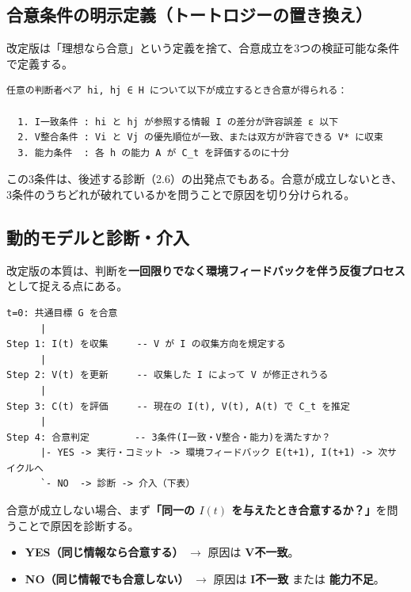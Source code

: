 \documentclass[11pt]{ltjsarticle}
\begin{document}
\subsection{合意条件の明示定義（トートロジーの置き換え）}

改定版は「理想なら合意」という定義を捨て、合意成立を3つの検証可能な条件で定義する。

\begin{Verbatim}[frame=single,fontsize=\small]
任意の判断者ペア hi, hj ∈ H について以下が成立するとき合意が得られる：

  1. I一致条件 : hi と hj が参照する情報 I の差分が許容誤差 ε 以下
  2. V整合条件 : Vi と Vj の優先順位が一致、または双方が許容できる V* に収束
  3. 能力条件  : 各 h の能力 A が C_t を評価するのに十分
\end{Verbatim}

この3条件は、後述する診断（2.6）の出発点でもある。合意が成立しないとき、3条件のうちどれが破れているかを問うことで原因を切り分けられる。

\subsection{動的モデルと診断・介入}

改定版の本質は、判断を\textbf{一回限りでなく環境フィードバックを伴う反復プロセス}として捉える点にある。

\begin{Verbatim}[frame=single,fontsize=\small]
t=0: 共通目標 G を合意
      |
Step 1: I(t) を収集     -- V が I の収集方向を規定する
      |
Step 2: V(t) を更新     -- 収集した I によって V が修正されうる
      |
Step 3: C(t) を評価     -- 現在の I(t), V(t), A(t) で C_t を推定
      |
Step 4: 合意判定        -- 3条件(I一致・V整合・能力)を満たすか？
      |- YES -> 実行・コミット -> 環境フィードバック E(t+1), I(t+1) -> 次サイクルへ
      `- NO  -> 診断 -> 介入（下表）
\end{Verbatim}

合意が成立しない場合、まず\textbf{「同一の $I(t)$ を与えたとき合意するか？」}を問うことで原因を診断する。

\begin{itemize}[nosep]
  \item \textbf{YES（同じ情報なら合意する）} $\to$ 原因は \textbf{V不一致}。
  \item \textbf{NO（同じ情報でも合意しない）} $\to$ 原因は \textbf{I不一致} または \textbf{能力不足}。
\end{itemize}
\end{document}
